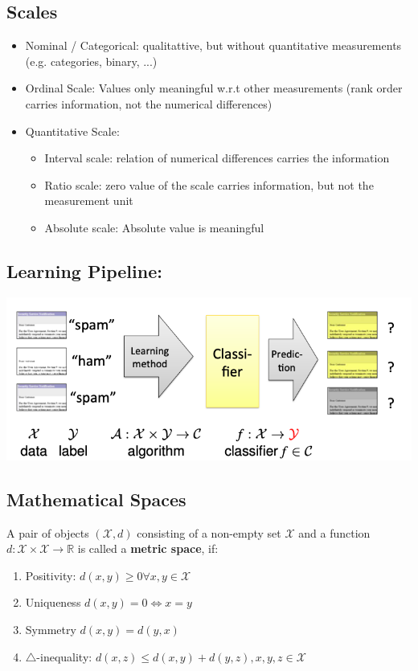 \subsection{Scales}
\begin{itemize}
	\item Nominal / Categorical: qualitattive, but without quantitative measurements (e.g. categories, binary, ...)
	\item Ordinal Scale: Values only meaningful w.r.t other measurements (rank order carries information, not the numerical differences)
	\item Quantitative Scale:
	\begin{itemize}
		\item Interval scale: relation of numerical differences carries the information
		\item Ratio scale: zero value of the scale carries information, but not the measurement unit
		\item Absolute scale: Absolute value is meaningful
	\end{itemize}
\end{itemize}

\subsection{Learning Pipeline: }
\begin{center}
	\includegraphics[width = 0.8\columnwidth]{images/2-pipeline}
\end{center}

\subsection{Mathematical Spaces}
A pair of objects $(\mathcal X, d)$ consisting of a non-empty set $\mathcal X$ and a function $d:\mathcal X \times \mathcal X \to \mathbb R$ is called a \textbf{metric space}, if:
\begin{enumerate}
	\item Positivity: $d(x,y) \geq 0 \forall x,y \in \mathcal X$
	\item Uniqueness $d(x,y) = 0 \iff x = y$
	\item Symmetry $d(x,y) = d(y,x)$
	\item $\triangle$-inequality: $d(x,z) \leq d(x,y) + d(y,z), x,y,z\in \mathcal X$
\end{enumerate}

